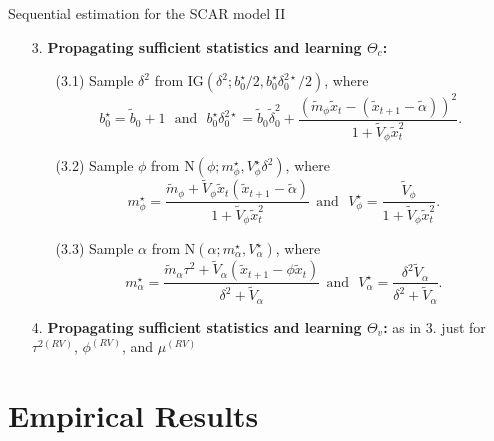 \documentclass[9pt,xcolor=x11names,compress]{beamer}
\begin{document}
\begin{frame}{Sequential estimation for the SCAR model II}

	\begin{itemize}
	\item[3.]\textbf{Propagating sufficient statistics and learning $\Theta_c$:}
		\begin{itemize}
			\item[(3.1)]  Sample $\delta^2$ from $\text{IG}(\delta^2; b_0^{\star}/2,b_0^{\star}\delta_0^{2\star}/2)$, where
			$$
			b_0^{\star}=\tilde{b}_0+1\:\:\:\text{and}\:\:\:b_0^{\star}\delta_0^{2\star} = \tilde{b}_0\tilde{\delta}_0^2+\frac{(\tilde{m}_{\phi}\tilde{x}_{t}-(\tilde{x}_{t+1}-\tilde{\alpha}))^2}{1+\tilde{V}_{\phi}\tilde{x}_{t}^2}.\:\:
			$$
			\item[(3.2)] Sample $\phi$ from $\text{N}(\phi; m_{\phi}^{\star},V_{\phi}^{\star}\delta^2)$, where
			$$
			m_{\phi}^{\star}=\frac{\tilde{m}_{\phi}+\tilde{V}_{\phi}\tilde{x}_{t}(\tilde{x}_{t+1}-\tilde{\alpha})}{1+\tilde{V}_{\phi}\tilde{x}_{t}^2}\:\:\text{and}\:\:\:V_{\phi}^{\star} = \frac{\tilde{V}_{\phi}}{1+\tilde{V}_{\phi}\tilde{x}_{t}^2}.
			$$
			\item[(3.3)] Sample $\alpha$ from $\text{N}(\alpha; m_{\alpha}^{\star},V_{\alpha}^{\star})$, where
			$$
			m_{\alpha}^{\star} = \frac{\tilde{m}_{\alpha}\tau^2+\tilde{V}_{\alpha}(\tilde{x}_{t+1}-\phi\tilde{x}_{t})}{\delta^2+\tilde{V}_{\alpha}}\:\:\text{and}\:\:\:V_{\alpha}^{\star} = \frac{\delta^2 \tilde{V}_{\alpha}}{\delta^2+\tilde{V}_{\alpha}}.
			$$
		\end{itemize}
	\vspace{0.3cm}
	\item[4.]\textbf{Propagating sufficient statistics and learning $\Theta_v$:} as in 3. just for $\tau^{2(RV)}$, $\phi^{(RV)}$, and $
	\mu^{(RV)}$
	\end{itemize}  
\end{frame}

\section{Empirical Results}
\end{document}
